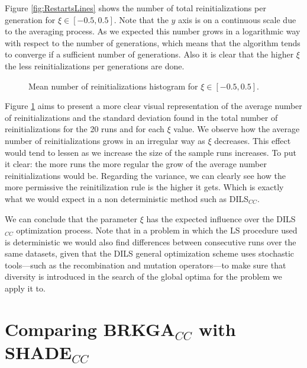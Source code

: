 Figure \ref{fig:RestartsLines} shows the number of total reinitializations per generation for $\xi \in [-0.5,0.5]$. Note that the $y$ axis is on a continuous scale due to the averaging process. As we expected this number grows in a logarithmic way with respect to the number of generations, which means that the algorithm tends to converge if a sufficient number of generations. Also it is clear that the higher $\xi$ the less reinitializations per generations are done.


\begin{figure}[bth]
	\myfloatalign
	\hspace{1cm}
	\caption{Mean number of reinitializations histogram for $\xi \in [-0.5,0.5]$.}
	\label{fig:RestartsHist}
\end{figure}

Figure \ref{fig:RestartsHist} aims to present a more clear visual representation of the average number of reinitializations and the standard deviation found in the total number of reinitializations for the 20 runs and for each $\xi$ value. We observe how the average number of reinitializations grows in an irregular way as $\xi$ decreases. This effect would tend to lessen as we increase the size of the sample runs increases. To put it clear: the more runs the more regular the grow of the average number reinitializations would be. Regarding the variance, we can clearly see how the more permissive the reinitilization rule is the higher it gets. Which is exactly what we would expect in a non deterministic method such as \acs{DILS}$_{CC}$.

We can conclude that the parameter $\xi$ has the expected influence over the \acs{DILS}$_{CC}$ optimization process. Note that in a problem in which the \acs{LS} procedure used is deterministic we would also find differences between consecutive runs over the same datasets, given that the \acs{DILS} general optimization scheme uses stochastic tools---such as the recombination and mutation operators---to make sure that diversity is introduced in the search of the global optima for the problem we apply it to.

\section{Comparing BRKGA$_{CC}$ with SHADE$_{CC}$} \label{sec:BRKGAvsSHADE}

